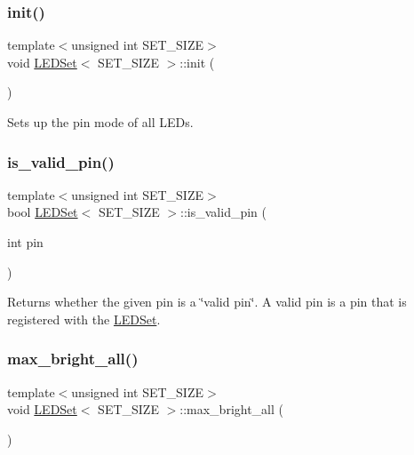 \subsubsection{\texorpdfstring{init()}{init()}}
{\footnotesize\ttfamily template$<$unsigned int S\+E\+T\+\_\+\+S\+I\+ZE$>$ \\
void \hyperlink{classLEDSet}{L\+E\+D\+Set}$<$ S\+E\+T\+\_\+\+S\+I\+ZE $>$\+::init (\begin{DoxyParamCaption}{ }\end{DoxyParamCaption})\hspace{0.3cm}{\ttfamily [inline]}}



Sets up the pin mode of all L\+E\+Ds. 

\mbox{\label{classLEDSet_ab3c7ec4740bab77f762dcd48fba26579}} 
\subsubsection{\texorpdfstring{is\+\_\+valid\+\_\+pin()}{is\_valid\_pin()}}
{\footnotesize\ttfamily template$<$unsigned int S\+E\+T\+\_\+\+S\+I\+ZE$>$ \\
bool \hyperlink{classLEDSet}{L\+E\+D\+Set}$<$ S\+E\+T\+\_\+\+S\+I\+ZE $>$\+::is\+\_\+valid\+\_\+pin (\begin{DoxyParamCaption}\item[{int}]{pin }\end{DoxyParamCaption})\hspace{0.3cm}{\ttfamily [inline]}}



Returns whether the given pin is a \char`\"{}valid pin\char`\"{}. A valid pin is a pin that is registered with the \hyperlink{classLEDSet}{L\+E\+D\+Set}. 

\mbox{\label{classLEDSet_a73dae073882d369a9cc9b9a93f446157}} 
\subsubsection{\texorpdfstring{max\+\_\+bright\+\_\+all()}{max\_bright\_all()}}
{\footnotesize\ttfamily template$<$unsigned int S\+E\+T\+\_\+\+S\+I\+ZE$>$ \\
void \hyperlink{classLEDSet}{L\+E\+D\+Set}$<$ S\+E\+T\+\_\+\+S\+I\+ZE $>$\+::max\+\_\+bright\+\_\+all (\begin{DoxyParamCaption}{ }\end{DoxyParamCaption})\hspace{0.3cm}{\ttfamily [inline]}}



